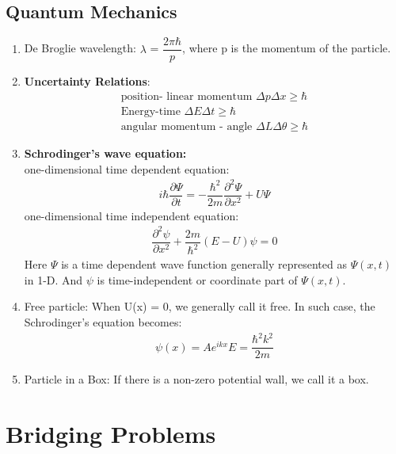 \subsection{Quantum Mechanics}
\begin{enumerate}
    \item De Broglie wavelength: $\lambda$ = $\dfrac{2 \pi \hbar}{p}$, where p is the momentum of the particle. 
    \item \textbf{Uncertainty Relations}: 
    \begin{align}
        \text{position- linear momentum }\Delta p \Delta x \geq \hbar \\
        \text{Energy-time }\Delta E \Delta t \geq \hbar\\
        \text{angular momentum - angle }\Delta L \Delta \theta \geq \hbar
    \end{align}
    \item \textbf{Schrodinger's wave equation:}\\
    one-dimensional time dependent equation: 
    \begin{align} 
        i\hbar\dfrac{\partial \Psi}{\partial t} = - \dfrac{\hbar ^2}{2m}\dfrac{\partial ^2 \Psi}{\partial x^2} + U \Psi
    \end{align}
    one-dimensional time independent equation: 
    \begin{align}
        \dfrac{\partial^2 \psi}{\partial x^2} + \dfrac{2m}{\hbar ^2}(E- U)\psi = 0
    \end{align}
    Here $\Psi$ is a time dependent wave function generally represented as $\Psi(x,t)$ in 1-D. And $\psi$ is time-independent or coordinate part of $\Psi (x, t)$. 
    
    \item Free particle: When U(x) = 0, we generally call it free. In such case, the Schrodinger's equation becomes: 
    \begin{align*}
        \psi(x) = Ae^{ikx}E = \dfrac{\hbar^2 k^2}{2m}
    \end{align*}
    \item Particle in a Box: If there is a non-zero potential wall, we call it a box.  
\end{enumerate}
\section{Bridging Problems}

